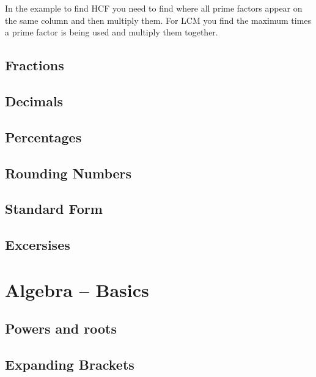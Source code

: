 \documentclass[
]{book}
\begin{document}
In the example to find HCF you need to find where all prime factors appear on the same column and then multiply them.
For LCM you find the maximum times a prime factor is being used and multiply them together.

\hypertarget{fractions}{%
\section{Fractions}\label{fractions}}

\hypertarget{decimals}{%
\section{Decimals}\label{decimals}}

\hypertarget{percentages}{%
\section{Percentages}\label{percentages}}

\hypertarget{rounding-numbers}{%
\section{Rounding Numbers}\label{rounding-numbers}}

\hypertarget{standard-form}{%
\section{Standard Form}\label{standard-form}}

\hypertarget{excersises}{%
\section{Excersises}\label{excersises}}

\hypertarget{algebra-basics}{%
\chapter{Algebra -- Basics}\label{algebra-basics}}

\hypertarget{powers-and-roots}{%
\section{Powers and roots}\label{powers-and-roots}}

\hypertarget{expanding-brackets}{%
\section{Expanding Brackets}\label{expanding-brackets}}
\end{document}
